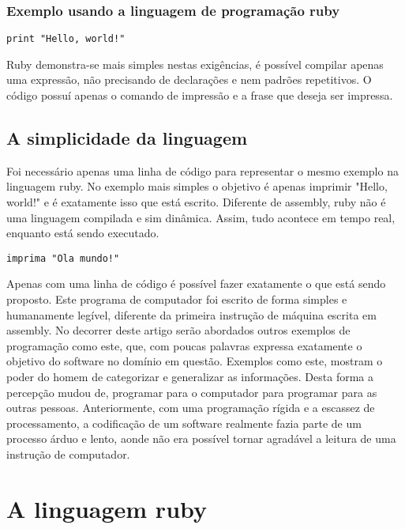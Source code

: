 \documentclass[espaco=simples,appendix=Name]{abnt}
\begin{document}
\subsection {Exemplo usando a linguagem de programação ruby}

\begin{lstlisting}[caption=Exemplo em ruby]
   print "Hello, world!"
\end{lstlisting}

 Ruby demonstra-se mais simples nestas exigências, é possível compilar apenas uma expressão, não precisando de declarações e nem padrões repetitivos. O código possuí apenas o comando de impressão e a frase que deseja ser impressa.

\section { A simplicidade da linguagem }

Foi necessário apenas uma linha de código para representar o mesmo exemplo na linguagem ruby. No exemplo mais simples o objetivo é apenas imprimir "Hello, world!" e é exatamente isso que está escrito. Diferente de assembly, ruby não é uma linguagem compilada e sim dinâmica. Assim, tudo acontece em tempo real, enquanto está sendo executado.
   
\begin{lstlisting}[caption=Tradução do programa ruby]
   imprima "Ola mundo!"
\end{lstlisting}

Apenas com uma linha de código é possível fazer exatamente o que está sendo proposto. Este programa de computador foi escrito de forma simples e humanamente legível, diferente da primeira instrução de máquina escrita em assembly. No decorrer deste artigo serão abordados outros exemplos de programação como este, que, com poucas palavras expressa exatamente o objetivo do software no domínio em questão.
Exemplos como este, mostram o poder do homem de categorizar e generalizar as informações. Desta forma a percepção mudou de, programar para o computador para programar para as outras pessoas. Anteriormente, com uma programação rígida e a escassez de processamento, a codificação de um software realmente fazia parte de um processo árduo e lento, aonde não era possível tornar agradável a leitura de uma instrução de computador.


\chapter { A linguagem ruby }
\end{document}
